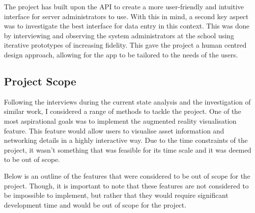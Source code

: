 \documentclass [11pt,a4paper]{article}
\begin{document}
The project has built upon the API to create a more user-friendly and intuitive interface for server administrators to use. With this in mind, a second key aspect was to investigate the best interface for data entry in this context. This was done by interviewing and observing the system administrators at the school using iterative prototypes of increasing fidelity. This gave the project a human centred design approach, allowing for the app to be tailored to the needs of the users.

\subsection{Project Scope}
\label{sec:stretchgoals}

Following the interviews during the current state analysis and the investigation of similar work, I considered a range of methods to tackle the project. One of the most aspirational goals was to implement the augmented reality visualisation feature. This feature would allow users to visualise asset information and networking details in a highly interactive way. Due to the time constraints of the project, it wasn't something that was feasible for its time scale and it was deemed to be out of scope. 

Below is an outline of the features that were considered to be out of scope for the project. Though, it is important to note that these features are not considered to be impossible to implement, but rather that they would require significant development time and would be out of scope for the project.
\end{document}
